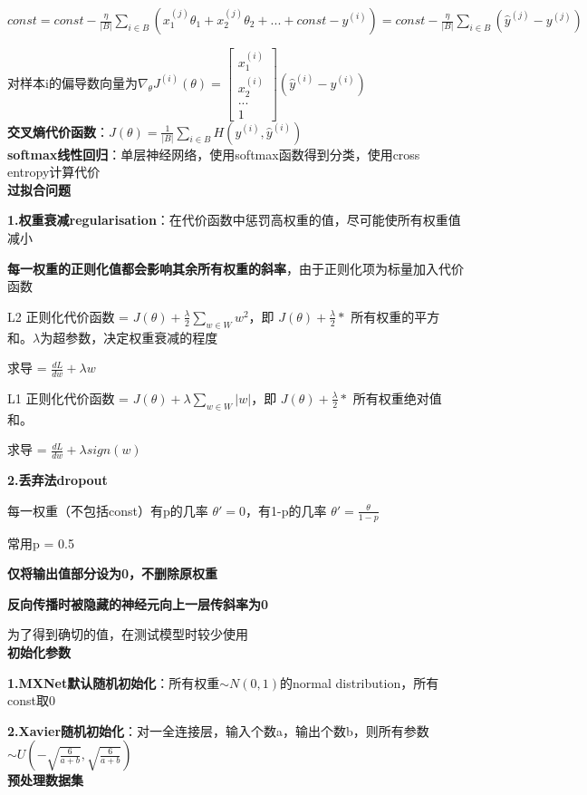 \documentclass[UTF8]{ctexart}
\begin{document}
  \quad $const = const - \frac{\eta}{|B|}\sum_{i\in B} (x^{(j)}_1\theta_1 + x^{(j)}_2\theta_2 + ... + const - y^{(i)}) = const - \frac{\eta}{|B|}\sum_{i\in B}(\hat{y}^{(j)} - y^{(j)})$

  \quad 对样本i的偏导数向量为$\nabla _{\theta}J^{(i)}(\theta) = 
    \begin{bmatrix}
    x^{(i)}_1 \\
    x^{(i)}_2 \\
    ... \\
    1
    \end{bmatrix}(\hat{y}^{(i)} - y^{(i)})
    $\\
\textbf{交叉熵代价函数}：$J(\theta) = \frac{1}{|B|}\sum_{i\in B} H(y^{(i)}, \hat{y}^{(i)})$\\
\textbf{softmax线性回归}：单层神经网络，使用softmax函数得到分类，使用cross entropy计算代价\\
\textbf{过拟合问题}

  \textbf{1.权重衰减regularisation}：在代价函数中惩罚高权重的值，尽可能使所有权重值减小

  \quad \textbf{每一权重的正则化值都会影响其余所有权重的斜率}，由于正则化项为标量加入代价函数

  \quad L2 正则化代价函数 = $J(\theta) + \frac{\lambda}{2}\sum_{w\in W}w^2$，即 $J(\theta) + \frac{\lambda}{2} * $ 所有权重的平方和。$\lambda$为超参数，决定权重衰减的程度

  \quad \quad 求导 = $\frac{dL}{dw} + \lambda w$
  
  \quad L1 正则化代价函数 = $J(\theta) + \lambda \sum_{w\in W} |w|$，即 $J(\theta) + \frac{\lambda}{2} * $ 所有权重绝对值和。

  \quad \quad 求导 = $\frac{dL}{dw} + \lambda sign(w)$

  \textbf{2.丢弃法dropout}

  \quad 每一权重（不包括const）有p的几率 $\theta' = 0$，有1-p的几率 $\theta' = \frac{\theta}{1-p}$

  \quad \quad 常用p = 0.5

  \quad \quad \textbf{仅将输出值部分设为0，不删除原权重}

  \quad \quad \textbf{反向传播时被隐藏的神经元向上一层传斜率为0}

  \quad 为了得到确切的值，在测试模型时较少使用\\
\textbf{初始化参数}

  \textbf{1.MXNet默认随机初始化}：所有权重$\sim N(0, 1)$的normal distribution，所有const取0

  \textbf{2.Xavier随机初始化}：对一全连接层，输入个数a，输出个数b，则所有参数$\sim U(-\sqrt{\frac{6}{a+b}}, \sqrt{\frac{6}{a+b}})$\\
\textbf{预处理数据集}
\end{document}
